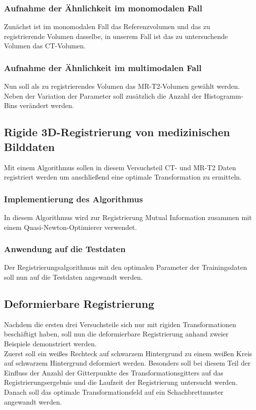 \subsubsection{Aufnahme der Ähnlichkeit im monomodalen Fall}
Zunächst ist im monomodalen Fall das Referenzvolumen und das zu registrierende
Volumen dasselbe, in unserem Fall ist das zu untersuchende Volumen das
CT-Volumen.

\subsubsection{Aufnahme der Ähnlichkeit im multimodalen Fall}
Nun soll als zu registrierendes Volumen das MR-T2-Volumen gewählt werden. Neben
der Variation der Parameter soll zusätzlich die Anzahl der Histogramm-Bins
verändert werden.

\subsection{Rigide 3D-Registrierung von medizinischen Bilddaten}
Mit einem Algorithmus sollen in diesem Versuchsteil CT- und MR-T2 Daten
registriert werden um anschließend eine optimale Transformation zu ermitteln.
\subsubsection{Implementierung des Algorithmus}
In diesem Algorithmus wird zur Registrierung Mutual Information zusammen mit
einem Quasi-Newton-Optimierer verwendet. 
\subsubsection{Anwendung auf die Testdaten}
Der Registrierungsalgorithmus mit den optimalen Parameter der Trainingsdaten
soll nun auf die Testdaten angewandt werden.

\subsection{Deformierbare Registrierung}
Nachdem die ersten drei Versuchsteile sich nur mit rigiden Transformationen
beschäftigt haben, soll nun die deformierbare Registrierung anhand zweier
Beispiele demonstriert werden.\\
Zuerst soll ein weißes Rechteck auf schwarzem Hintergrund zu einem weißen Kreis
auf schwarzem Hintergrund deformiert werden. Besonders soll bei diesem Teil der
Einfluss der Anzahl der Gitterpunkte des Transformationsgitters auf das
Registrierungsergebnis und die Laufzeit der Registrierung untersucht werden.
Danach soll das optimale Transformationsfeld auf ein Schachbrettmuster
angewandt werden.
